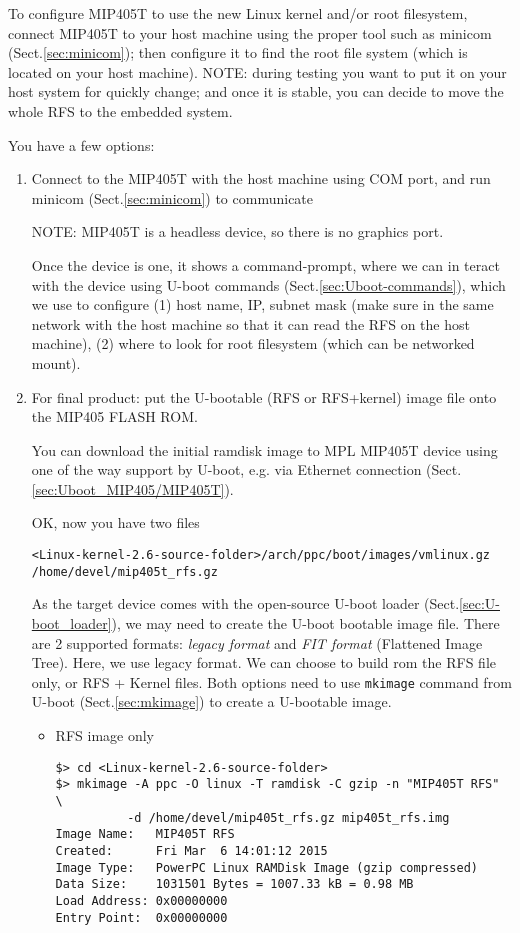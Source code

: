 To configure MIP405T to use the new Linux kernel and/or root filesystem,
connect MIP405T to your  host machine using the proper tool such as minicom
(Sect.\ref{sec:minicom}); then configure it to find the root file system
(which is located on your host machine). NOTE: during testing you want to put
it on your host system for quickly change; and once it is stable, you can
decide to move the whole RFS to the embedded system.

You have a few options:
\begin{enumerate}
  \item Connect to the MIP405T with the host machine using COM port, and run
  minicom (Sect.\ref{sec:minicom}) to communicate

NOTE: MIP405T is a headless device, so there is no graphics port.  
  
  Once the device is one, it shows a command-prompt, where we can 
in teract with the device using U-boot commands
(Sect.\ref{sec:Uboot-commands}), which we use to configure (1)
host name, IP, subnet mask (make sure in the same network with the host
machine so that it can read the RFS on the host machine), (2) where to look for
root filesystem (which can be networked mount).
  
  \item For final product: put the U-bootable (RFS or RFS+kernel) image file 
  onto the MIP405 FLASH ROM.
  
You can download the initial ramdisk image to MPL MIP405T device using one of
the way support by U-boot, e.g. via Ethernet connection
(Sect.\ref{sec:Uboot_MIP405/MIP405T}).
  
OK, now you have two files
\begin{verbatim}
<Linux-kernel-2.6-source-folder>/arch/ppc/boot/images/vmlinux.gz
/home/devel/mip405t_rfs.gz
\end{verbatim}
As the target device comes with the open-source U-boot loader
(Sect.\ref{sec:U-boot_loader}), we may need to create the U-boot bootable image
file. There are 2 supported formats: {\it legacy format} and {\it FIT format}
(Flattened Image Tree). Here, we use legacy format.
We can choose to build rom the RFS file only, or RFS + Kernel files.
Both options need to use \verb!mkimage! command from U-boot
(Sect.\ref{sec:mkimage}) to create a U-bootable image.
\begin{itemize}
  \item RFS image only

\begin{verbatim}
$> cd <Linux-kernel-2.6-source-folder>
$> mkimage -A ppc -O linux -T ramdisk -C gzip -n "MIP405T RFS"  \ 
          -d /home/devel/mip405t_rfs.gz mip405t_rfs.img
Image Name:   MIP405T RFS
Created:      Fri Mar  6 14:01:12 2015
Image Type:   PowerPC Linux RAMDisk Image (gzip compressed)
Data Size:    1031501 Bytes = 1007.33 kB = 0.98 MB
Load Address: 0x00000000
Entry Point:  0x00000000


\end{verbatim}
\end{itemize}
\end{enumerate}
